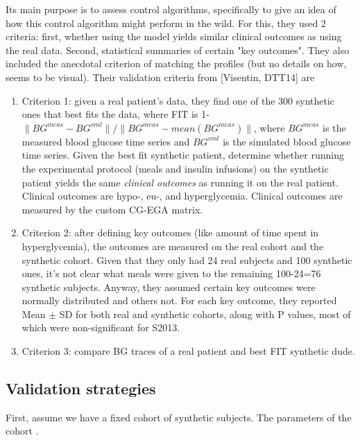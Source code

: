 Its main purpose is to assess control algorithms, specifically to give an idea of how this control algorithm might perform in the wild.
For this, they used 2 criteria: first, whether using the model yields similar clinical outcomes as using the real data. 
Second, statistical summaries of certain "key outcomes".
They also included the anecdotal criterion of matching the profiles (but no details on how, seems to be visual).
Their validation criteria from [Visentin, DTT14] are
\begin{enumerate}
	\item Criterion 1: given a real patient's data, they find one of the 300 synthetic ones that best fits the data, where FIT is 1- $\|BG^{meas} - BG^{sml}\|/\|BG^{meas}-mean(BG^{meas})\|$, where $BG^{meas}$ is the measured blood glucose time series and $BG^{sml}$ is the simulated blood glucose time series.
	Given the best fit synthetic patient, determine whether running the experimental protocol (meals and insulin infusions) on the synthetic patient yields the same \emph{clinical outcomes} as running it on the real patient.
	Clinical outcomes are hypo-, eu-, and hyperglycemia. 
	Clinical outcomes are measured by the custom CG-EGA matrix.
	
	\item Criterion 2: after defining key outcomes (like amount of time spent in hyperglycemia), the outcomes are measured on the real cohort and the synthetic cohort.
	Given that they only had 24 real subjects and 100 synthetic ones, it's not clear what meals were given to the remaining 100-24=76 synthetic subjects.
	Anyway, they assumed certain key outcomes were normally distributed and others not. 
	For each key outcome, they reported Mean $\pm$ SD for both real and synthetic cohorts, along with P values, most of which were non-significant for S2013.
	
	\item Criterion 3: compare BG traces of a real patient and best FIT synthetic dude.
\end{enumerate}

\subsection{Validation strategies}
First, assume we have a fixed cohort of synthetic subjects.
The parameters of the cohort . 


